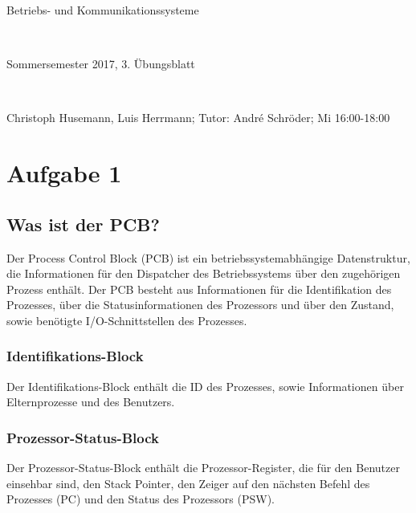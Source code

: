 \documentclass[numbers=noendperiod]{scrartcl}
\begin{document}
	
\newcommand{\inputmintedframed}[2]{
	\begin{mdframed}[linecolor=bg,backgroundcolor=bg]
		\inputminted[mathescape,breaklines,linenos,numbersep=5pt,tabsize=3]{#1}{#2}
	\end{mdframed}}
	
\hrulefill
\begin{center}
	\bfseries %
	\sffamily %
	\begin{huge}
		Betriebs- und Kommunikationssysteme
	\end{huge}\\
	\begin{Large}
		Sommersemester 2017, 3. Übungsblatt
	\end{Large}\\
	\begin{small}
		Christoph Husemann, Luis Herrmann; Tutor: André Schröder; Mi 16:00-18:00
	\end{small}
	
	\vspace{-10pt}
\end{center}
\hrulefill

\section{Aufgabe 1}
\subsection{Was ist der PCB?}
Der Process Control Block (PCB) ist ein betriebssystemabhängige Datenstruktur, die Informationen für den Dispatcher des Betriebssystems über den zugehörigen Prozess enthält. Der PCB besteht aus Informationen für die Identifikation des Prozesses, über die Statusinformationen des Prozessors und über den Zustand, sowie benötigte I/O-Schnittstellen des Prozesses.
\subsubsection{Identifikations-Block}
Der Identifikations-Block enthält die ID des Prozesses, sowie Informationen über Elternprozesse und des Benutzers.
\subsubsection{Prozessor-Status-Block}
Der Prozessor-Status-Block enthält die Prozessor-Register, die für den Benutzer einsehbar sind, den Stack Pointer, den Zeiger auf den nächsten Befehl des Prozesses (PC) und den Status des Prozessors (PSW).
\end{document}
